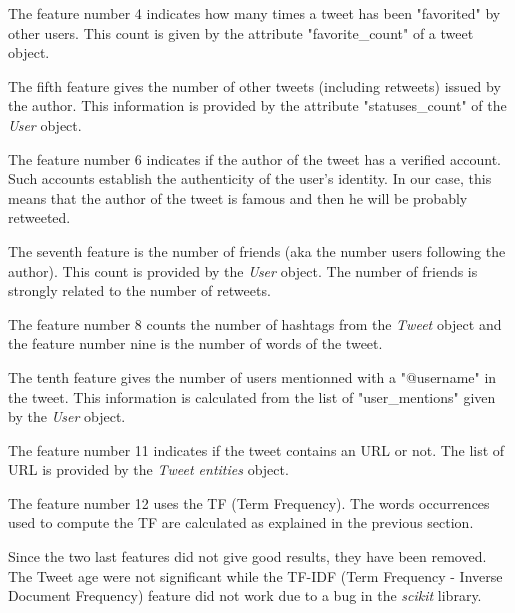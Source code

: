 The feature number 4 indicates how many times a tweet has been "favorited" by 
other users. This count is given by the attribute "favorite\_count"  of a tweet 
object.

The fifth feature gives the number of other tweets (including retweets) issued 
by the author. This information is provided by the attribute "statuses\_count" 
of the \emph{User} object.

The feature number 6 indicates if the author of the tweet has a verified 
account. Such accounts establish the authenticity of the user's identity. In 
our case, this means that the author of the tweet is famous and then he will be 
probably retweeted.

The seventh feature is the number of friends (aka the number users following 
the author). This count is provided by the \emph{User} object. The number of 
friends is strongly related to the number of retweets.

The feature number 8 counts the number of hashtags from the \emph{Tweet} 
object and the feature number nine is the number of words of the tweet.

The tenth feature gives the number of users mentionned with a "@username" in 
the tweet. This information is calculated from the list of "user\_mentions" 
given by the \emph{User} object.

The feature number 11 indicates if the tweet contains an URL or not. The 
list of URL is provided by the \emph{Tweet entities} object.

The feature number 12 uses the TF (Term Frequency). The words occurrences 
used to compute the TF are calculated as explained in the previous section.

Since the two last features did not give good results, they have been 
removed. The Tweet age were not significant while the TF-IDF (Term Frequency - 
Inverse Document Frequency) feature did not work due to a bug in the 
\emph{scikit} library.